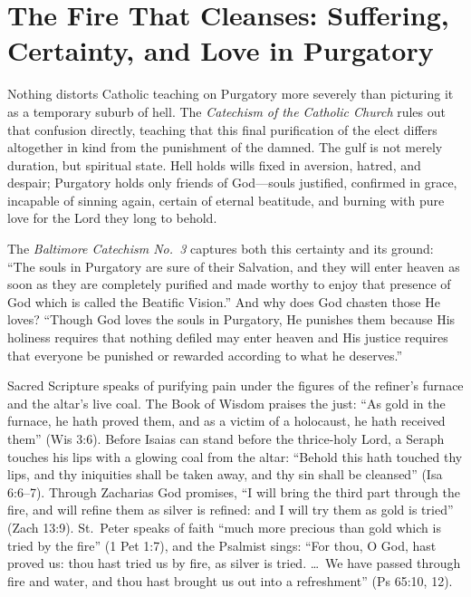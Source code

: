 \section{The Fire That Cleanses: Suffering, Certainty, and Love in Purgatory}

Nothing distorts Catholic teaching on Purgatory more severely than picturing it as a temporary suburb of hell. The \textit{Catechism of the Catholic Church} rules out that confusion directly, teaching that this final purification of the elect differs altogether in kind from the punishment of the damned. The gulf is not merely duration, but spiritual state. Hell holds wills fixed in aversion, hatred, and despair; Purgatory holds only friends of God---souls justified, confirmed in grace, incapable of sinning again, certain of eternal beatitude, and burning with pure love for the Lord they long to behold.

The \textit{Baltimore Catechism No.\ 3} captures both this certainty and its ground: ``The souls in Purgatory are sure of their Salvation, and they will enter heaven as soon as they are completely purified and made worthy to enjoy that presence of God which is called the Beatific Vision.'' And why does God chasten those He loves? ``Though God loves the souls in Purgatory, He punishes them because His holiness requires that nothing defiled may enter heaven and His justice requires that everyone be punished or rewarded according to what he deserves.''

Sacred Scripture speaks of purifying pain under the figures of the refiner's furnace and the altar's live coal. The Book of Wisdom praises the just: ``As gold in the furnace, he hath proved them, and as a victim of a holocaust, he hath received them'' (Wis 3:6). Before Isaias can stand before the thrice-holy Lord, a Seraph touches his lips with a glowing coal from the altar: ``Behold this hath touched thy lips, and thy iniquities shall be taken away, and thy sin shall be cleansed'' (Isa 6:6--7). Through Zacharias God promises, ``I will bring the third part through the fire, and will refine them as silver is refined: and I will try them as gold is tried'' (Zach 13:9). St.\ Peter speaks of faith ``much more precious than gold which is tried by the fire'' (1 Pet 1:7), and the Psalmist sings: ``For thou, O God, hast proved us: thou hast tried us by fire, as silver is tried. \dots\ We have passed through fire and water, and thou hast brought us out into a refreshment'' (Ps 65:10, 12).

